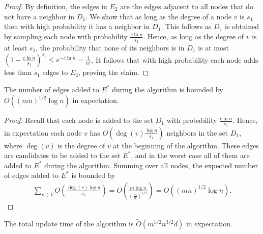 \begin{proof}
By definition, the edges in $E_2$ are the edges adjacent to all nodes that do not have a neighbor in $D_1$. We show that as long as the degree of a node $v$ is $s_1$ then with high probability it has a neighbor in $D_1$. This follows as $D_1$ is obtained by sampling each node with probability $\frac{c \ln{n}}{s_1}$. Hence, as long as the degree of $v$ is at least $s_1$, the probability that none of its neighbors is in $D_1$ is at most $(1-\frac{c\ln{n}}{s_1})^{s_1} \leq e^{-c\ln{n}}=\frac{1}{n^c}$. It follows that with high probability each node adds less than $s_1$ edges to $E_2$, proving the claim.
\end{proof}

\begin{claim} \label{claim_warmup_E*}
The number of edges added to $E^*$ during the algorithm is bounded by $O( (mn)^{1/2}\log{n} )$ in expectation.
\end{claim}

\begin{proof}
Recall that each node is added to the set $D_1$ with probability $\frac{c \ln{n}}{s_1}$. Hence, in expectation each node $v$ has $O(\deg(v) \frac{\log{n}}{s_1})$ neighbors in the set $D_1$, where $\deg(v)$ is the degree of $v$ at the beginning of the algorithm. These edges are candidates to be added to the set $E^*$, and in the worst case all of them are added to $E^*$ during the algorithm. Summing over all nodes, the expected number of edges added to $E^*$ is bounded by 
\begin{align*}
    \sum_{v \in V} O \left( \frac{\deg(v)\log{n}}{s_1} \right) = O \left( \frac{m\log{n}}{(\frac{m}{n})^{1/2}} \right) = O( (mn)^{1/2}\log{n} ).
\end{align*} 
\end{proof}

\begin{lemma}
The total update time of the algorithm is $\tilde{O}(m^{1/2}n^{3/2}d)$ in expectation.
\end{lemma}

